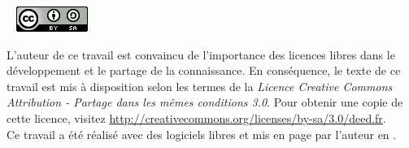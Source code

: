 
~ \vfill
\noindent \includegraphics[]{img/cc-by-sa.png}

\footnotesize
\noindent L'auteur de ce travail est convaincu de l'importance des licences libres dans
le développement et le partage de la connaissance.
En conséquence, le texte de ce travail est mis à disposition selon les termes 
de la \emph{Licence Creative Commons Attribution - Partage dans les mêmes 
conditions 3.0}. Pour obtenir une copie de cette licence, visitez  
\url{http://creativecommons.org/licenses/by-sa/3.0/deed.fr}.
\\ 

\noindent Ce travail a été réalisé avec des logiciels libres et mis en page par 
l'auteur en \LaTeXe.
\normalsize
\thispagestyle{empty}
